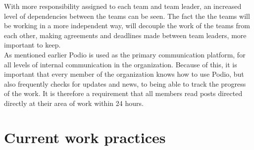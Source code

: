 With more responsibility assigned to each team and team leader, an increased level of dependencies between the teams can be seen. The fact the the teams will be working in a more independent way, will decouple the work of the teams from each other, making agreements and deadlines made between team leaders, more important to keep.\\

As mentioned earlier Podio is used as the primary communication platform, for all levels of internal communication in the organization. Because of this, it is important that every member of the organization knows how to use Podio, but also frequently checks for updates and news, to being able to track the progress of the work. It is therefore a requirement that all members read posts directed directly at their area of work within 24 hours. 

\section{Current work practices}



